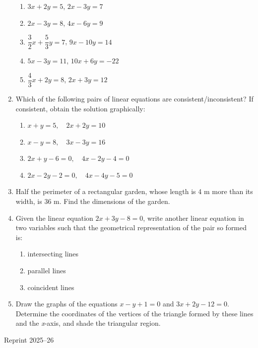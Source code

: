 \documentclass[12pt]{article}
\begin{document}
\begin{enumerate}
\begin{multicols}{2}
\begin{enumerate}[label=(\roman*)]
    \item \(3x + 2y = 5\), \quad \(2x - 3y = 7\)

    \item \(2x - 3y = 8\), \quad \(4x - 6y = 9\)

    \item \( \dfrac{3}{2}x + \dfrac{5}{3}y = 7 \), \quad \(9x - 10y = 14\)

    \item \(5x - 3y = 11\), \quad \(10x + 6y = -22\)

    \item \( \dfrac{4}{3}x + 2y = 8 \), \quad \(2x + 3y = 12\)
\end{enumerate}
\end{multicols}

\item Which of the following pairs of linear equations are consistent/inconsistent? If consistent, obtain the solution graphically:

\begin{enumerate}[label=(\roman*)]
    \item \(x + y = 5,\quad 2x + 2y = 10\)
    \item \(x - y = 8,\quad 3x - 3y = 16\)
    \item \(2x + y - 6 = 0,\quad 4x - 2y - 4 = 0\)
    \item \(2x - 2y - 2 = 0,\quad 4x - 4y - 5 = 0\)
\end{enumerate}

\item Half the perimeter of a rectangular garden, whose length is 4 m more than its width, is 36 m. Find the dimensions of the garden.

\item Given the linear equation \(2x + 3y - 8 = 0\), write another linear equation in two variables such that the geometrical representation of the pair so formed is:
\begin{enumerate}[label=(\roman*)]
    \item intersecting lines
    \item parallel lines
    \item coincident lines
\end{enumerate}

\item Draw the graphs of the equations \(x - y + 1 = 0\) and \(3x + 2y - 12 = 0\). Determine the coordinates of the vertices of the triangle formed by these lines and the \textit{x}-axis, and shade the triangular region.
\end{enumerate}
\vfill
\begin{center}
{Reprint 2025–26}
\end{center}
\newpage
\end{document}
